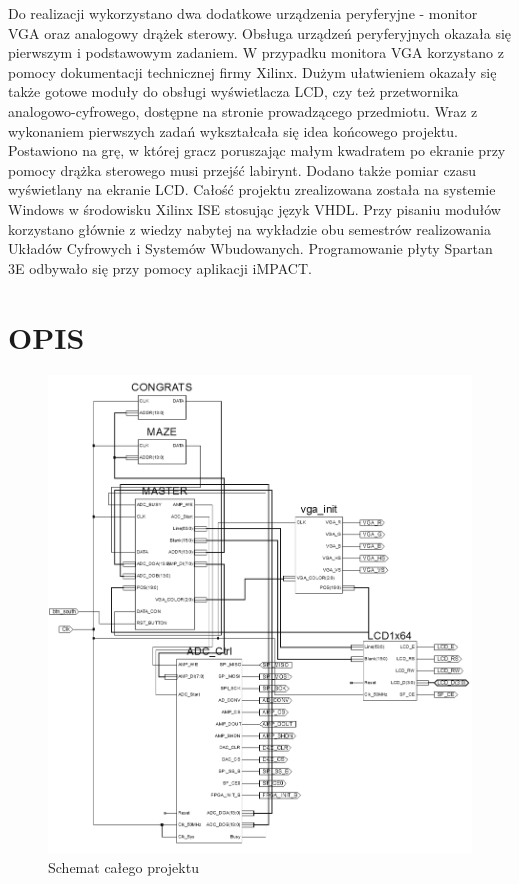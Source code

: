 \documentclass[11pt]{article}
\begin{document}
Do realizacji wykorzystano dwa dodatkowe urządzenia peryferyjne - monitor VGA oraz analogowy drążek sterowy.
Obsługa urządzeń peryferyjnych okazała się pierwszym i podstawowym zadaniem. 
W przypadku monitora VGA korzystano z pomocy dokumentacji technicznej firmy Xilinx\cite{pa}.
Dużym ułatwieniem okazały się także gotowe moduły do obsługi wyświetlacza LCD, czy też przetwornika analogowo-cyfrowego, dostępne na stronie prowadzącego przedmiotu\cite{pb}.
Wraz z wykonaniem pierwszych zadań wykształcała się idea końcowego projektu.
Postawiono na grę, w której gracz poruszając małym kwadratem po ekranie przy pomocy drążka sterowego musi przejść labirynt.
Dodano także pomiar czasu wyświetlany na ekranie LCD.
Całość projektu zrealizowana została na systemie Windows w środowisku Xilinx ISE stosując język VHDL.
Przy pisaniu modułów korzystano głównie z wiedzy nabytej na wykładzie obu semestrów realizowania Układów Cyfrowych i Systemów Wbudowanych\cite{pc}.
Programowanie płyty Spartan 3E odbywało się przy pomocy aplikacji iMPACT.

\section{OPIS}

\begin{figure}[H]
\center
\includegraphics[scale=.6]{schemat.png}
\caption{Schemat całego projektu}
\end{figure}
\end{document}

